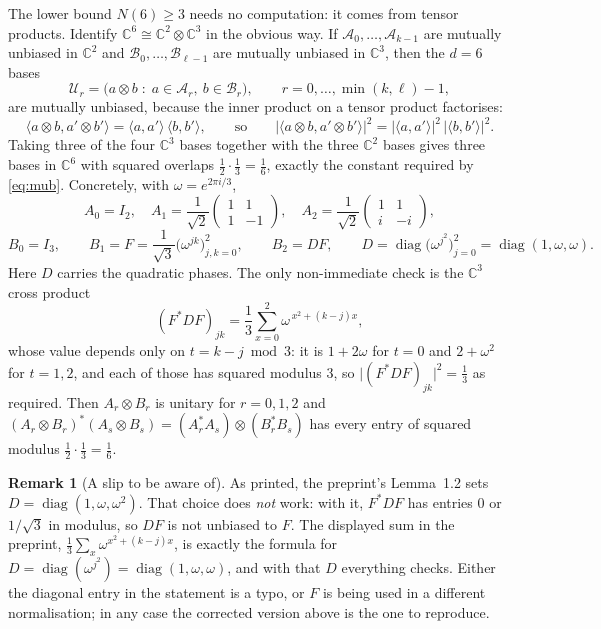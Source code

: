 \documentclass[11pt]{article}
\theoremstyle{definition}
\newtheorem{remark}[definition]{Remark}
\theoremstyle{plain}
\theoremstyle{definition}
\newcommand{\C}{\mathbb{C}}
\newcommand{\inner}[2]{\langle #1,#2\rangle}
\newcommand{\abs}[1]{\lvert #1\rvert}
\DeclareMathOperator{\diag}{diag}
\begin{document}
The lower bound $N(6)\ge3$ needs no computation: it comes from tensor products. Identify
$\C^6\cong\C^2\otimes\C^3$ in the obvious way. If $\mathcal A_0,\dots,\mathcal A_{k-1}$ are mutually
unbiased in $\C^2$ and $\mathcal B_0,\dots,\mathcal B_{\ell-1}$ are mutually unbiased in $\C^3$,
then the $d=6$ bases
\[
\mathcal U_r=\bigl(a\otimes b \;:\; a\in\mathcal A_r,\ b\in\mathcal B_r\bigr),\qquad r=0,\dots,\min(k,\ell)-1,
\]
are mutually unbiased, because the inner product on a tensor product factorises:
\begin{equation}\label{eq:tensor}
\inner{a\otimes b}{a'\otimes b'}=\inner{a}{a'}\,\inner{b}{b'},
\qquad\text{so}\qquad
\abs{\inner{a\otimes b}{a'\otimes b'}}^2=\abs{\inner{a}{a'}}^2\,\abs{\inner{b}{b'}}^2 .
\end{equation}
Taking three of the four $\C^3$ bases together with the three $\C^2$ bases gives three bases in
$\C^6$ with squared overlaps $\tfrac12\cdot\tfrac13=\tfrac16$, exactly the constant required by
\eqref{eq:mub}. Concretely, with $\omega=e^{2\pi i/3}$,
\[
A_0=I_2,\quad
A_1=\frac1{\sqrt2}\begin{pmatrix}1&1\\1&-1\end{pmatrix},\quad
A_2=\frac1{\sqrt2}\begin{pmatrix}1&1\\ i&-i\end{pmatrix},
\]
\[
B_0=I_3,\qquad
B_1=F=\frac1{\sqrt3}\bigl(\omega^{jk}\bigr)_{j,k=0}^{2},\qquad
B_2=DF,\qquad D=\diag\bigl(\omega^{j^2}\bigr)_{j=0}^{2}=\diag(1,\omega,\omega).
\]
Here $D$ carries the quadratic phases. The only non-immediate check is the $\C^3$ cross product
\[
(F^*DF)_{jk}=\frac13\sum_{x=0}^{2}\omega^{\,x^2+(k-j)x},
\]
whose value depends only on $t=k-j \bmod 3$: it is $1+2\omega$ for $t=0$ and $2+\omega^2$ for
$t=1,2$, and each of those has squared modulus $3$, so $\abs{(F^*DF)_{jk}}^2=\tfrac13$ as required.
Then $A_r\otimes B_r$ is unitary for $r=0,1,2$ and
$(A_r\otimes B_r)^*(A_s\otimes B_s)=(A_r^*A_s)\otimes(B_r^*B_s)$ has every entry of squared modulus
$\tfrac12\cdot\tfrac13=\tfrac16$.

\begin{remark}[A slip to be aware of]\label{rem:typo}
As printed, the preprint's Lemma~1.2 sets $D=\diag(1,\omega,\omega^2)$. That choice does
\emph{not} work: with it, $F^*DF$ has entries $0$ or $1/\sqrt3$ in modulus, so $DF$ is not unbiased
to $F$. The displayed sum in the preprint, $\frac13\sum_x\omega^{x^2+(k-j)x}$, is exactly the formula
for $D=\diag(\omega^{j^2})=\diag(1,\omega,\omega)$, and with that $D$ everything checks. Either the
diagonal entry in the statement is a typo, or $F$ is being used in a different normalisation; in any
case the corrected version above is the one to reproduce.
\end{remark}
\end{document}

